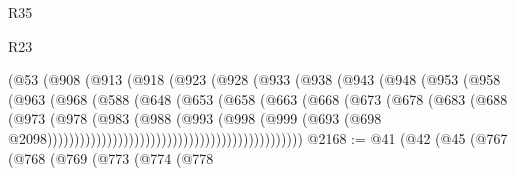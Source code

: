 \begin{lexlean}{R35}
\begin{lexlean}{R23}
\begin{coremodule}
{{{{{{{{{{{{{{{{{{{{{                                (@53
                                  (@908
                                    (@913
                                      (@918
                                        (@923
                                          (@928
                                            (@933
                                              (@938
                                                (@943
                                                  (@948
                                                    (@953
                                                      (@958
                                                        (@963
                                                          (@968
                                                            (@588
                                                              (@648
                                                                (@653
                                                                  (@658
                                                                    (@663
                                                                      (@668
                                                                        (@673
                                                                          (@678
                                                                            (@683
                                                                              (@688
                                                                                (@973
                                                                                  (@978
                                                                                    (@983
                                                                                      (@988
                                                                                        (@993
                                                                                          (@998
                                                                                            (@999
                                                                                              (@693
                                                                                                (@698
                                                                                                  @2098)))))))))))))))))))))))))))))))))))))))))))))))
@2168 := @41
    (@42
      (@45
        (@767
          (@768
            (@769
              (@773
                (@774
                  (@778
}}}}}}}}}}}}}}}}}}}}}
\end{coremodule}
\end{lexlean}
\end{lexlean}
